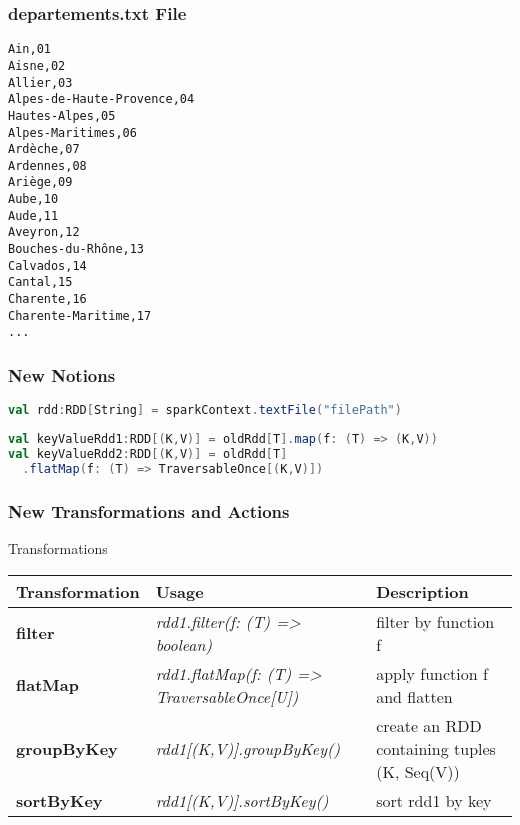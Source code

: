 \documentclass[slidetop,9pt,utf8]{beamer}
\begin{document}
\begin{CJK}{UTF8}{gbsn}
\begin{frame}
  

\end{frame}

\begin{frame}[fragile]
  \frametitle{departements.txt File}

  \begin{verbatim}
Ain,01
Aisne,02
Allier,03
Alpes-de-Haute-Provence,04
Hautes-Alpes,05
Alpes-Maritimes,06
Ardèche,07
Ardennes,08
Ariège,09
Aube,10
Aude,11
Aveyron,12
Bouches-du-Rhône,13
Calvados,14
Cantal,15
Charente,16
Charente-Maritime,17
...
  \end{verbatim}

\end{frame}

\begin{frame}[fragile]
  \frametitle{New Notions}

  \begin{lstlisting}[label=LoadTextFile, caption=Load Text File, language=scala, style=code]
val rdd:RDD[String] = sparkContext.textFile("filePath")
  \end{lstlisting}

  \begin{lstlisting}[label=TransformToKeyValue, caption=Transform RDD to a Key/Value RDD, language=scala, style=code]
val keyValueRdd1:RDD[(K,V)] = oldRdd[T].map(f: (T) => (K,V))
val keyValueRdd2:RDD[(K,V)] = oldRdd[T]
  .flatMap(f: (T) => TraversableOnce[(K,V)])
  \end{lstlisting}

\end{frame}

\begin{frame}

  \frametitle{New Transformations and Actions}

  \begin{block}{Transformations}
    \begin{center}
      \begin{tabular}{|m{2.1cm}|m{3.5cm}|m{5cm}|}
        \hline 
        \rowcolor{gray} \textbf{Transformation} & \textbf{Usage} & \textbf{Description} \\ \hline
        \textbf{filter} & \textit{rdd1.filter(f: (T) =\textgreater\xspace boolean)} & filter by function f \\ \hline
        \textbf{flatMap} & \textit{rdd1.flatMap(f: (T) =\textgreater\xspace TraversableOnce[U])} & apply function f and flatten \\ \hline
        \textbf{groupByKey} & \textit{rdd1[(K,V)].groupByKey()} & create an RDD containing tuples (K, Seq(V)) \\ \hline
        \textbf{sortByKey} & \textit{rdd1[(K,V)].sortByKey()} & sort rdd1 by key \\ \hline
      \end{tabular}
    \end{center}
  \end{block}


\end{frame}
\end{CJK}
\end{document}
